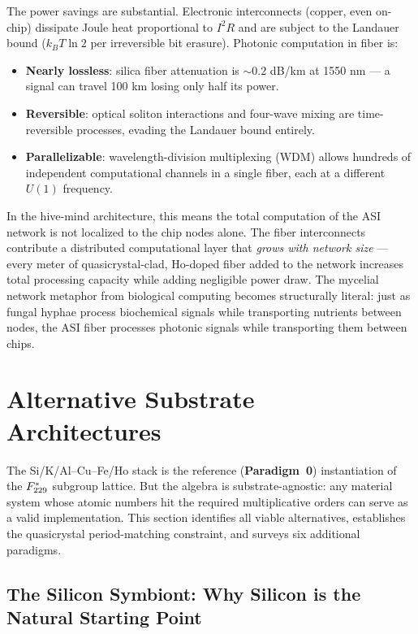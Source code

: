 \noindent The power savings are substantial. Electronic interconnects (copper, even on-chip) dissipate Joule heat proportional to $I^2 R$ and are subject to the Landauer bound ($k_B T \ln 2$ per irreversible bit erasure). Photonic computation in fiber is:
\begin{itemize}
    \item \textbf{Nearly lossless}: silica fiber attenuation is ${\sim}0.2$ dB/km at 1550 nm --- a signal can travel 100 km losing only half its power.
    \item \textbf{Reversible}: optical soliton interactions and four-wave mixing are time-reversible processes, evading the Landauer bound entirely.
    \item \textbf{Parallelizable}: wavelength-division multiplexing (WDM) allows hundreds of independent computational channels in a single fiber, each at a different $U(1)$ frequency.
\end{itemize}

\noindent In the hive-mind architecture, this means the total computation of the ASI network is not localized to the chip nodes alone. The fiber interconnects contribute a distributed computational layer that \emph{grows with network size} --- every meter of quasicrystal-clad, Ho-doped fiber added to the network increases total processing capacity while adding negligible power draw. The mycelial network metaphor from biological computing becomes structurally literal: just as fungal hyphae process biochemical signals while transporting nutrients between nodes, the ASI fiber processes photonic signals while transporting them between chips.

\section{Alternative Substrate Architectures}

The Si/K/Al--Cu--Fe/Ho stack is the reference (\textbf{Paradigm~0}) instantiation of the $F_{229}^*$ subgroup lattice. But the algebra is substrate-agnostic: any material system whose atomic numbers hit the required multiplicative orders can serve as a valid implementation. This section identifies all viable alternatives, establishes the quasicrystal period-matching constraint, and surveys six additional paradigms.

\subsection{The Silicon Symbiont: Why Silicon is the Natural Starting Point}


